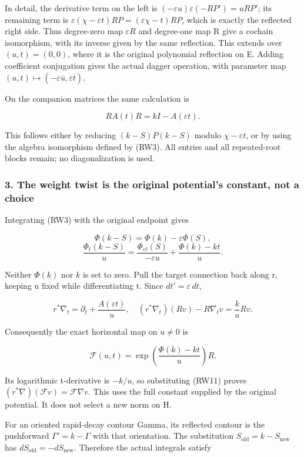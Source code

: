 In detail, the derivative term on the left is \((-\varepsilon u)\varepsilon(-RP')=uRP'\); its remaining term is \(\varepsilon(\chi-\varepsilon t)RP=(\varepsilon\chi-t)RP\), which is exactly the reflected right side. Thus degree-zero map \(\varepsilon R\) and degree-one map R give a cochain isomorphism, with its inverse given by the same reflection. This extends over \((u,t)=(0,0)\), where it is the original polynomial reflection on E. Adding coefficient conjugation gives the actual dagger operation, with parameter map \((u,t)\mapsto(-\varepsilon\overline u,\varepsilon\overline t)\).

On the companion matrices the same calculation is

\[
R A(t)R=kI-A(\varepsilon t).
\tag{RW9}
\]

This follows either by reducing \((k-S)P(k-S)\) modulo \(\chi-\varepsilon t\), or by using the algebra isomorphism defined by (RW3). All entries and all repeated-root blocks remain; no diagonalization is used.

\subsubsection{3. The weight twist is the original potential's constant, not a choice}\label{endpoint-f1_reflection--the-weight-twist-is-the-original-potentials-constant-not-a-choice}

Integrating (RW3) with the original endpoint gives

\[
\Phi(k-S)=\Phi(k)-\varepsilon\Phi(S),
\] \[
\boxed{\frac{\Phi_t(k-S)}u
=\frac{\Phi_{\varepsilon t}(S)}{-\varepsilon u}
 +\frac{\Phi(k)-kt}{u}.}
\tag{RW10}
\]

Neither \(\Phi(k)\) nor \(k\) is set to zero. Pull the target connection back along r, keeping u fixed while differentiating t. Since \(dt'=\varepsilon\,dt\),

\[
r^*\nabla_t=\partial_t+\frac{A(\varepsilon t)}u,
\quad
(r^*\nabla_t)(Rv)-R\nabla_tv=\frac ku Rv.
\tag{RW11}
\]

Consequently the exact horizontal map on \(u\ne0\) is

\[
\boxed{\mathcal F(u,t)
=\exp\!\left(\frac{\Phi(k)-kt}{u}\right)R.}
\tag{RW12}
\]

Its logarithmic t-derivative is \(-k/u\), so substituting (RW11) proves \((r^*\nabla)(\mathcal Fv)=\mathcal F\nabla v\). This uses the full constant supplied by the original potential. It does not select a new norm on H.

For an oriented rapid-decay contour Gamma, its reflected contour is the pushforward \(\Gamma'=k-\Gamma\) with that orientation. The substitution \(S_{\mathrm{old}}=k-S_{\mathrm{new}}\) has \(dS_{\mathrm{old}}=-dS_{\mathrm{new}}\). Therefore the actual integrals satisfy

